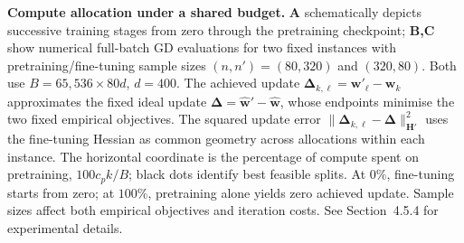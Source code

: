 \textbf{Compute allocation under a shared budget.}
\textbf{A} schematically depicts successive training stages from zero through the pretraining checkpoint; \textbf{B,C} show numerical full-batch GD evaluations for two fixed instances with pretraining/fine-tuning sample sizes $(n,n')=(80,320)$ and $(320,80)$.
Both use $B=65{,}536\times80d$, $d=400$.
The achieved update $\boldsymbol{\Delta}_{k,\ell}=\mathbf{w}'_{\ell}-\mathbf{w}_k$ approximates the fixed ideal update $\boldsymbol{\Delta}=\widehat{\mathbf{w}}'-\widehat{\mathbf{w}}$, whose endpoints minimise the two fixed empirical objectives.
The squared update error $\lVert\boldsymbol{\Delta}_{k,\ell}-\boldsymbol{\Delta}\rVert_{\mathbf{H}'}^2$ uses the fine-tuning Hessian as common geometry across allocations within each instance.
The horizontal coordinate is the percentage of compute spent on pretraining, $100c_pk/B$; black dots identify best feasible splits.
At $0\%$, fine-tuning starts from zero; at $100\%$, pretraining alone yields zero achieved update.
Sample sizes affect both empirical objectives and iteration costs.
See Section~4.5.4 for experimental details.
